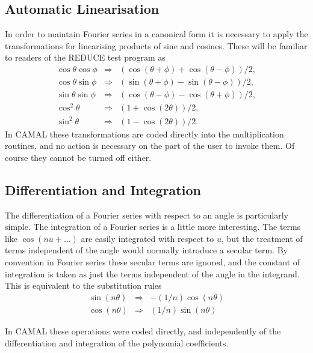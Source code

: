 \subsection{Automatic Linearisation}

In order to maintain Fourier series in a canonical form it is
necessary to apply the transformations for linearising products of
sine and cosines.  These will be familiar to readers of the REDUCE
test program as
\begin{eqnarray}
\cos \theta \cos \phi & \Rightarrow &
                (\cos(\theta+\phi)+\cos(\theta-\phi))/2, \\
\cos \theta \sin \phi & \Rightarrow &
                (\sin(\theta+\phi)-\sin(\theta-\phi))/2, \\
\sin \theta \sin \phi & \Rightarrow &
                (\cos(\theta-\phi)-\cos(\theta+\phi))/2, \\
\cos^2 \theta & \Rightarrow & (1+\cos(2\theta))/2,      \\
\sin^2 \theta & \Rightarrow & (1-\cos(2\theta))/2.
\end{eqnarray}
In CAMAL these transformations are coded directly into the
multiplication routines, and no action is necessary on the part of the
user to invoke them.  Of course they cannot be turned off either.

\subsection{Differentiation and Integration}

The differentiation of a Fourier series with respect to an angle is
particularly simple.  The integration of a Fourier series is a little
more interesting.  The terms like $\cos(n u + \ldots)$ are easily
integrated with respect to $u$, but the treatment of terms independent
of the angle would normally introduce a secular term.  By convention
in Fourier series these secular terms are ignored, and the constant of
integration is taken as just the terms independent of the angle in the
integrand.  This is equivalent to the substitution rules
\begin{eqnarray*}
\sin(n \theta) & \Rightarrow & -(1/n) \cos(n \theta) \\
\cos(n \theta) & \Rightarrow & (1/n) \sin(n \theta)
\end{eqnarray*}

In CAMAL these operations were coded directly, and independently of
the differentiation and integration of the polynomial coefficients.

